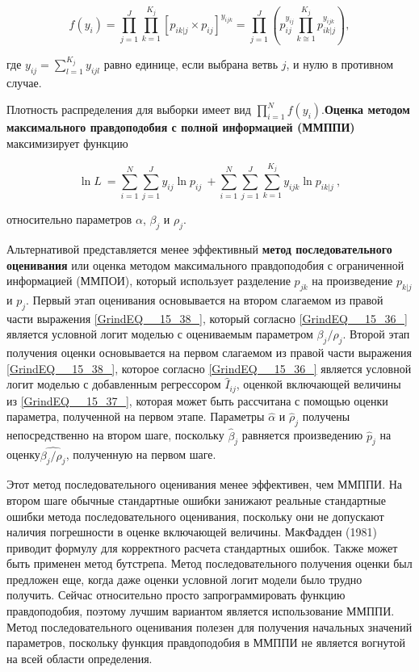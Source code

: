 \[f\left(y_i\right)=\prod^J_{j=1}{\prod^{K_j}_{k=1}{{\left[p_{ik|j}\times p_{ij}\right]}^{y_{ijk}}=\prod^J_{j=1}{\left(p^{y_{ij}}_{ij}\prod^{K_j}_{k\cong 1}{p^{y_{ijk}}_{ik|j}}\right)}},}\] 

где $y_{ij}=\sum^{K_j}_{l=1}{y_{ijl}}$ равно единице, если выбрана ветвь $j$, и нулю в противном случае.

Плотность распределения для выборки имеет вид $\prod^N_{i=1}{f\left(y_i\right).}$\textbf{Оценка методом максимального правдоподобия с полной информацией (ММППИ)} максимизирует функцию

\begin{equation} \label{GrindEQ__15_38_} {\ln  L\ }=\sum^N_{i=1}{\sum^J_{j=1}{y_{ij}{\ln  p_{ij}\ }}+\sum^N_{i=1}{\sum^J_{j=1}{\sum^{K_j}_{k=1}{y_{ijk}{\ln  p_{ik|j}\ }}}}}, \end{equation} 

относительно параметров $\alpha $, ${\beta }_j$ и ${\rho }_j.$

Альтернативой представляется менее эффективный \textbf{метод последовательного оценивания} или оценка методом максимального правдоподобия с ограниченной информацией (ММПОИ), который использует разделение $p_{jk}$ на произведение $p_{k|j}$ и $p_j$. Первый этап оценивания основывается на втором слагаемом из правой части выражения \eqref{GrindEQ__15_38_}, который согласно \eqref{GrindEQ__15_36_} является условной логит моделью с оцениваемым параметром ${\beta }_j/{\rho }_j.$ Второй этап получения оценки основывается на первом слагаемом из правой части выражения \eqref{GrindEQ__15_38_}, которое согласно \eqref{GrindEQ__15_36_} является условной логит моделью с добавленным регрессором ${\hat{I}}_{ij}$, оценкой включающей величины из \eqref{GrindEQ__15_37_}, которая может быть рассчитана с помощью оценки параметра, полученной на первом этапе. Параметры $\widehat{\alpha }$ и ${\widehat{\rho }}_j$ получены непосредственно на втором шаге, поскольку ${\widehat{\beta }}_j$ равняется произведению ${\hat{p}}_j$ на оценку$\widehat{{\beta }_j/{\rho }_j}$, полученную на первом шаге.

Этот метод последовательного оценивания менее эффективен, чем ММППИ. На втором шаге обычные стандартные ошибки занижают реальные стандартные ошибки метода последовательного оценивания, поскольку они не допускают наличия погрешности в оценке включающей величины. МакФадден (1981) приводит формулу для корректного расчета стандартных ошибок. Также может быть применен метод бутстрепа. Метод последовательного получения оценки был предложен еще, когда даже оценки условной логит модели было трудно получить. Сейчас относительно просто запрограммировать функцию правдоподобия, поэтому лучшим вариантом является использование ММППИ. Метод последовательного оценивания полезен для получения начальных значений параметров, поскольку функция правдоподобия в ММППИ не является вогнутой на всей области определения.

